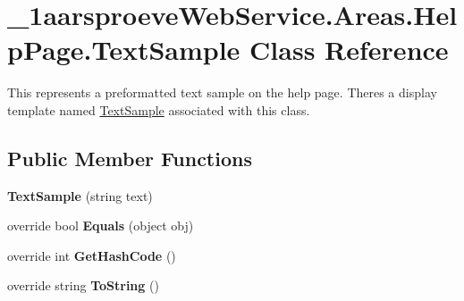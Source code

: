 \hypertarget{class__1aarsproeve_web_service_1_1_areas_1_1_help_page_1_1_text_sample}{}\section{\+\_\+1aarsproeve\+Web\+Service.\+Areas.\+Help\+Page.\+Text\+Sample Class Reference}
\label{class__1aarsproeve_web_service_1_1_areas_1_1_help_page_1_1_text_sample}


This represents a preformatted text sample on the help page. There\textquotesingle{}s a display template named \hyperlink{class__1aarsproeve_web_service_1_1_areas_1_1_help_page_1_1_text_sample}{Text\+Sample} associated with this class.  


\subsection*{Public Member Functions}
\begin{DoxyCompactItemize}
\item 
\hypertarget{class__1aarsproeve_web_service_1_1_areas_1_1_help_page_1_1_text_sample_a543e2aa253bd24774b7b5d50aa6d1770}{}{\bfseries Text\+Sample} (string text)\label{class__1aarsproeve_web_service_1_1_areas_1_1_help_page_1_1_text_sample_a543e2aa253bd24774b7b5d50aa6d1770}

\item 
\hypertarget{class__1aarsproeve_web_service_1_1_areas_1_1_help_page_1_1_text_sample_a1d5523486e9a0c505aa78bc05ea0b50c}{}override bool {\bfseries Equals} (object obj)\label{class__1aarsproeve_web_service_1_1_areas_1_1_help_page_1_1_text_sample_a1d5523486e9a0c505aa78bc05ea0b50c}

\item 
\hypertarget{class__1aarsproeve_web_service_1_1_areas_1_1_help_page_1_1_text_sample_ad37edf7bad0bd3016c03b96bcc26e8ad}{}override int {\bfseries Get\+Hash\+Code} ()\label{class__1aarsproeve_web_service_1_1_areas_1_1_help_page_1_1_text_sample_ad37edf7bad0bd3016c03b96bcc26e8ad}

\item 
\hypertarget{class__1aarsproeve_web_service_1_1_areas_1_1_help_page_1_1_text_sample_a832d14e2ad55878eec7de411c165c2fc}{}override string {\bfseries To\+String} ()\label{class__1aarsproeve_web_service_1_1_areas_1_1_help_page_1_1_text_sample_a832d14e2ad55878eec7de411c165c2fc}

\end{DoxyCompactItemize}
